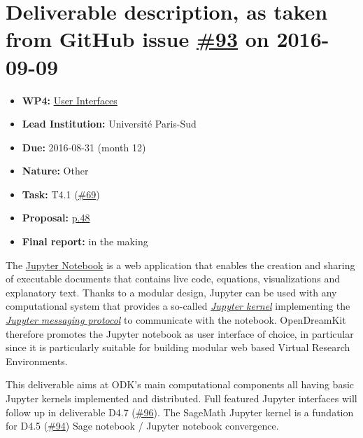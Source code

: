\section*{\texorpdfstring{Deliverable description, as taken from GitHub
issue
\href{https://github.com/OpenDreamKit/OpenDreamKit/issues/93}{\#93} on
2016-09-09}{Deliverable description, as taken from GitHub issue \#93 on 2016-09-09}}\label{deliverable-description-as-taken-from-github-issues-93-on-2016-09-09}

\begin{itemize}
\tightlist
\item
  \textbf{WP4:}
  \href{https://github.com/OpenDreamKit/OpenDreamKit/tree/master/WP4}{User
  Interfaces}
\item
  \textbf{Lead Institution:} Université Paris-Sud
\item
  \textbf{Due:} 2016-08-31 (month 12)
\item
  \textbf{Nature:} Other
\item
  \textbf{Task:} T4.1
  (\href{https://github.com/OpenDreamKit/OpenDreamKit/issues/69}{\#69})
\item
  \textbf{Proposal:}
  \href{https://github.com/OpenDreamKit/OpenDreamKit/raw/master/Proposal/proposal-www.pdf}{p.48}
\item
  \textbf{Final report:} in the making
\end{itemize}

The \href{https://jupyter.org}{Jupyter Notebook} is a web application
that enables the creation and sharing of executable documents that
contains live code, equations, visualizations and explanatory text.
Thanks to a modular design, Jupyter can be used with any computational
system that provides a so-called
\href{https://jupyter.readthedocs.io/en/latest/projects/kernels.html}{\emph{Jupyter
kernel}} implementing the
\href{https://jupyter-client.readthedocs.io/en/latest/}{\emph{Jupyter
messaging protocol}} to communicate with the notebook. OpenDreamKit
therefore promotes the Jupyter notebook as user interface of choice, in
particular since it is particularly suitable for building modular web
based Virtual Research Environments.

This deliverable aims at ODK's main computational components all having
basic Jupyter kernels implemented and distributed. Full featured Jupyter
interfaces will follow up in deliverable D4.7
(\href{https://github.com/OpenDreamKit/OpenDreamKit/issues/96}{\#96}).
The SageMath Jupyter kernel is a fundation for D4.5
(\href{https://github.com/OpenDreamKit/OpenDreamKit/issues/94}{\#94})
Sage notebook / Jupyter notebook convergence.

